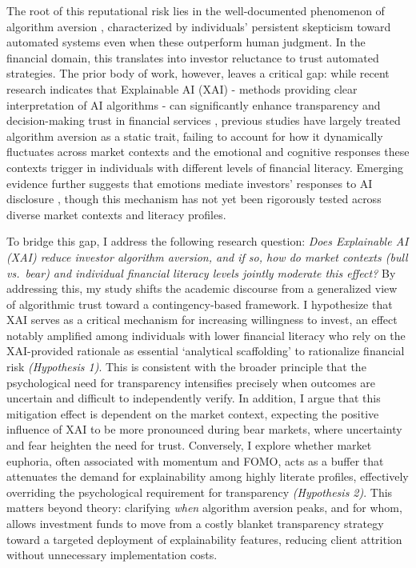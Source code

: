 \documentclass[10pt, a4paper]{article} %
\begin{document}
The root of this reputational risk lies in the well-documented phenomenon of algorithm aversion \citep{dietvorst2015algorithm}, characterized by individuals' persistent skepticism toward automated systems even when these outperform human judgment. In the financial domain, this translates into investor reluctance to trust automated strategies. The prior body of work, however, leaves a critical gap: while recent research indicates that Explainable AI (XAI) - methods providing clear interpretation of AI algorithms - can significantly enhance transparency and decision-making trust in financial services \citep{Staley2025TheRole}, previous studies have largely treated algorithm aversion as a static trait, failing to account for how it dynamically fluctuates across market contexts and the emotional and cognitive responses these contexts trigger in individuals with different levels of financial literacy. Emerging evidence further suggests that emotions mediate investors' responses to AI disclosure \citep{Downen2024Algorithm}, though this mechanism has not yet been rigorously tested across diverse market contexts and literacy profiles.

To bridge this gap, I address the following research question: \textit{Does Explainable AI (XAI) reduce investor algorithm aversion, and if so, how do market contexts (bull vs.\ bear) and individual financial literacy levels jointly moderate this effect?} By addressing this, my study shifts the academic discourse from a generalized view of algorithmic trust toward a contingency-based framework. I hypothesize that XAI serves as a critical mechanism for increasing willingness to invest, an effect notably amplified among individuals with lower financial literacy who rely on the XAI-provided rationale as essential `analytical scaffolding' to rationalize financial risk \textit{(Hypothesis 1)}. This is consistent with the broader principle that the psychological need for transparency intensifies precisely when outcomes are uncertain and difficult to independently verify. In addition, I argue that this mitigation effect is dependent on the market context, expecting the positive influence of XAI to be more pronounced during bear markets, where uncertainty and fear heighten the need for trust. Conversely, I explore whether market euphoria, often associated with momentum and FOMO, acts as a buffer that attenuates the demand for explainability among highly literate profiles, effectively overriding the psychological requirement for transparency \textit{(Hypothesis 2)}. This matters beyond theory: clarifying \textit{when} algorithm aversion peaks, and for whom, allows investment funds to move from a costly blanket transparency strategy toward a targeted deployment of explainability features, reducing client attrition without unnecessary implementation costs.
\end{document}
